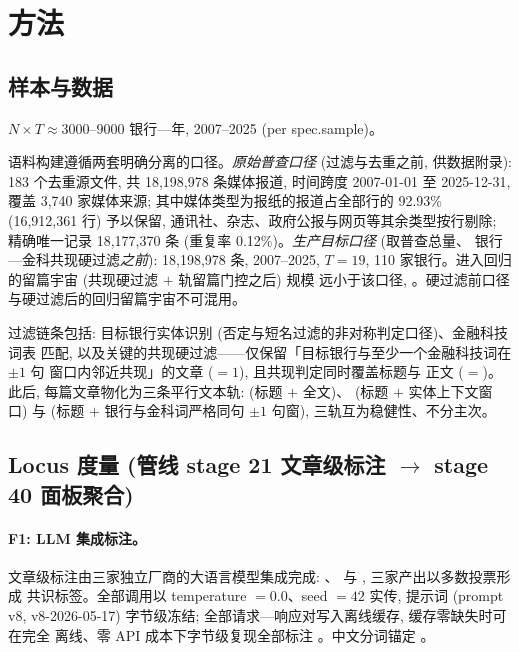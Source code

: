\section{方法}\label{sec:method}

\subsection{样本与数据}

$N \times T \approx 3000\text{--}9000$ 银行—年, 2007--2025 (per spec.sample)。

语料构建遵循两套明确分离的口径。\emph{原始普查口径} (过滤与去重之前, 供数据附录):
183 个去重源文件, 共 18{,}198{,}978 条媒体报道, 时间跨度 2007-01-01 至 2025-12-31,
覆盖 3{,}740 家媒体来源; 其中媒体类型为报纸的报道占全部行的 92.93\%
(16{,}912{,}361 行) 予以保留, 通讯社、杂志、政府公报与网页等其余类型按行剔除;
精确唯一记录 18{,}177{,}370 条 (重复率 0.12\%)。\emph{生产目标口径} (取普查总量、
银行—金科共现硬过滤\emph{之前}): 18{,}198{,}978 条, 2007--2025, $T=19$,
110 家银行。进入回归的留篇宇宙 (共现硬过滤 $+$  轨留篇门控之后) 规模
远小于该口径, 。硬过滤前口径与硬过滤后的回归留篇宇宙不可混用。

过滤链条包括: 目标银行实体识别 (否定与短名过滤的非对称判定口径)、金融科技词表
匹配, 以及关键的共现硬过滤——仅保留「目标银行与至少一个金融科技词在 $\pm 1$ 句
窗口内邻近共现」的文章 ($=1$), 且共现判定同时覆盖标题与
正文 ($=$)。此后, 每篇文章物化为三条平行文本轨:
 (标题 $+$ 全文)、 (标题 $+$ 实体上下文窗口) 与 
(标题 $+$ 银行与金科词严格同句 $\pm 1$ 句窗), 三轨互为稳健性、不分主次。

\subsection{Locus 度量 (管线 stage 21 文章级标注 $\to$ stage 40 面板聚合)}

\paragraph{F1: LLM 集成标注。}
文章级标注由三家独立厂商的大语言模型集成完成: 、
 与 , 三家产出以多数投票形成
共识标签。全部调用以 temperature $=0.0$、seed $=42$ 实传, 提示词 (prompt v8,
v8-2026-05-17) 字节级冻结; 全部请求—响应对写入离线缓存, 缓存零缺失时可在完全
离线、零 API 成本下字节级复现全部标注 \parencite{ludwig2025llmecon,
carlson2026llmannotation}。中文分词锚定 。


